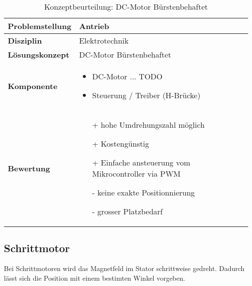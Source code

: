 \documentclass[../../main.tex]{subfiles}
\begin{document}
    \begin{flushleft}
        \begin{table}[H]
        \begin{tabular}{ | l | p{11cm} |}
        \hline
        \textbf{Problemstellung} & Antrieb \\ \hline
        \textbf{Disziplin} & Elektrotechnik \\ \hline
        \textbf{Lösungskonzept} & DC-Motor Bürstenbehaftet\\ \hline
        \textbf{Komponente} & \begin{itemize}
            \item DC-Motor ... TODO
            \item Steuerung / Treiber (H-Brücke)
            \end{itemize}\\ \hline
        \textbf{Bewertung} &  \begin{itemize}
                                \item[+] hohe Umdrehungszahl möglich 
                                \item[+] Kostengünstig 
                                \item[+] Einfache ansteuerung vom Mikrocontroller via PWM 
                                \item[-] keine exakte Positionnierung
                                \item[-] grosser Platzbedarf
                              \end{itemize} \\ \hline
        \end{tabular}
        \caption{Konzeptbeurteilung: DC-Motor Bürstenbehaftet}
        \label{tab:antr_konzept_dcMotor_buerstenbehaftet}
    \end{table}
    \end{flushleft}

    \subsection{Schrittmotor}
    Bei Schrittmotoren wird das Magnetfeld im Stator schrittweise gedreht. Dadurch lässt sich die Position mit einem bestimten Winkel vorgeben.
\end{document}
